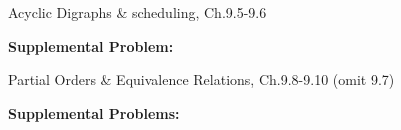 \documentclass[handout]{mcs}
\begin{document}

\begin{staffnotes}
Acyclic Digraphs \& scheduling, Ch.9.5-9.6
\end{staffnotes}



\textbf{Supplemental Problem:}



\begin{staffnotes}
Partial Orders \& Equivalence Relations, Ch.9.8-9.10 (omit 9.7)
\end{staffnotes}


\textbf{Supplemental Problems:}



\end{document}
